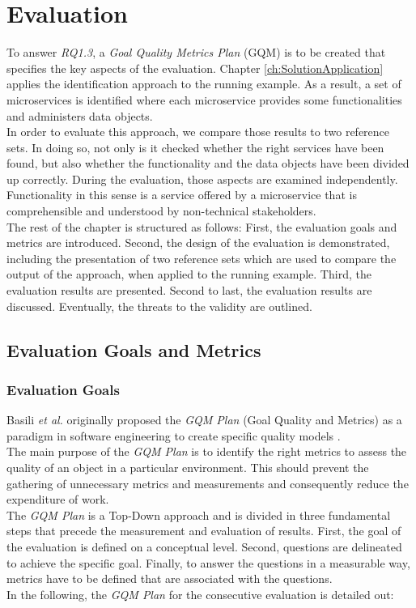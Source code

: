 \chapter{Evaluation}
\label{ch:Evalutation}

To answer \textit{RQ1.3}, a \textit{Goal Quality Metrics Plan } (GQM) is to be created that specifies the key aspects of the evaluation. 
Chapter \ref{ch:SolutionApplication} applies the identification approach to the running example. As a result, a set of microservices is identified where each microservice provides some functionalities and administers data objects.\\
In order to evaluate this approach, we compare those results to two reference sets. In doing so, not only is it checked whether the right services have been found, but also whether the functionality and the data objects have been divided up correctly. During the evaluation, those aspects are examined independently. Functionality in this sense is a service offered by a microservice that is comprehensible and understood by non-technical stakeholders. \\
The rest of the chapter is structured as follows: First, the evaluation goals and metrics are introduced. Second, the design of the evaluation is demonstrated, including the presentation of two reference sets which are used to compare the output of the approach, when applied to the running example. Third, the evaluation results are presented. Second to last, the evaluation results are discussed. Eventually, the threats to the validity are outlined.


\section{Evaluation Goals and Metrics}

\subsection{Evaluation Goals}
\label{sec:Evaluation:GQM}
Basili \textit{et al.} originally proposed the \textit{GQM Plan} (Goal Quality and Metrics) as a paradigm in software engineering to create specific quality models \cite{BasiliGQM}. \\
The main purpose of the \textit{GQM Plan} is to identify the right metrics to assess the quality of an object in a particular environment. This should prevent the gathering of unnecessary metrics and measurements and consequently reduce the expenditure of work. \\
The \textit{GQM Plan} is a Top-Down approach and is divided in three fundamental steps that precede the measurement and evaluation of results. First, the goal of the evaluation is defined on a conceptual level. Second, questions are delineated to achieve the specific goal. Finally, to answer the questions in a measurable way, metrics have to be defined that are associated with the questions. \\
In the following, the \textit{GQM Plan} for the consecutive evaluation is detailed out:

